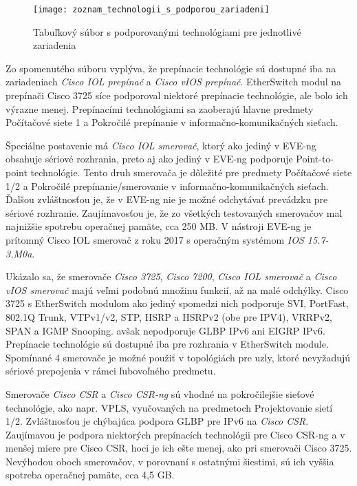 \begin{figure}
    \centering
    \texttt{[image: zoznam\_technologii\_s\_podporou\_zariadeni]}
    \caption{Tabuľkový súbor s podporovanými technológiami pre jednotlivé zariadenia}
    \label{obr:zoznam_technologii_s_podporou_zariadeni}
\end{figure}

Zo spomenutého súboru vyplýva, že prepínacie technológie sú dostupné iba na zariadeniach \emph{Cisco IOL prepínač} a \emph{Cisco vIOS prepínač}. EtherSwitch modul na prepínači Cisco 3725 síce podporoval niektoré prepínacie technológie, ale bolo ich výrazne menej. Prepínacími technológiami sa zaoberajú hlavne predmety Počítačové siete 1 a Pokročilé prepínanie v informačno-komunikačných sieťach.

Špeciálne postavenie má \emph{Cisco IOL smerovač}, ktorý ako jediný v EVE-ng obsahuje sériové rozhrania, preto aj ako jediný v EVE-ng podporuje Point-to-point technológie. Tento druh smerovača je dôležité pre predmety Počítačové siete 1/2 a Pokročilé prepínanie/smerovanie v informačno-komunikačných sieťach. Ďalšou zvláštnosťou je, že v EVE-ng nie je možné odchytávať prevádzku pre sériové rozhranie. Zaujímavosťou je, že zo všetkých testovaných smerovačov mal najnižšie spotrebu operačnej pamäte, cca 250 MB. V nástroji EVE-ng je prítomný Cisco IOL smerovač z roku 2017 s operačným systémom \emph{IOS 15.7-3.M0a}.

Ukázalo sa, že smerovače \emph{Cisco 3725}, \emph{Cisco 7200}, \emph{Cisco IOL smerovač} a \emph{Cisco vIOS smerovač} majú veľmi podobnú množinu funkcií, až na malé odchýlky. Cisco 3725 s EtherSwitch modulom ako jediný spomedzi nich podporuje SVI, PortFast, 802.1Q Trunk, VTPv1/v2, STP, HSRP a HSRPv2 (obe pre IPV4), VRRPv2, SPAN a IGMP Snooping. avšak nepodporuje GLBP IPv6 ani EIGRP IPv6. Prepínacie technológie sú dostupné iba pre rozhrania v EtherSwitch module. Spomínané 4 smerovače je možné použiť v topológiách pre uzly, ktoré nevyžadujú sériové prepojenia v rámci ľubovoľného predmetu.

Smerovače \emph{Cisco CSR} a \emph{Cisco CSR-ng} sú vhodné na pokročilejšie sieťové technológie, ako napr. VPLS, vyučovaných na predmetoch Projektovanie sietí 1/2. Zvláštnosťou je chýbajúca podpora GLBP pre IPv6 na \emph{Cisco CSR}. Zaujímavou je podpora niektorých prepínacích technológii pre Cisco CSR-ng a v menšej miere pre Cisco CSR, hoci je ich ešte menej, ako pri smerovači Cisco 3725. Nevýhodou oboch smerovačov, v porovnaní s ostatnými šiestimi, sú ich vyššia spotreba operačnej pamäte, cca 4,5 GB.

